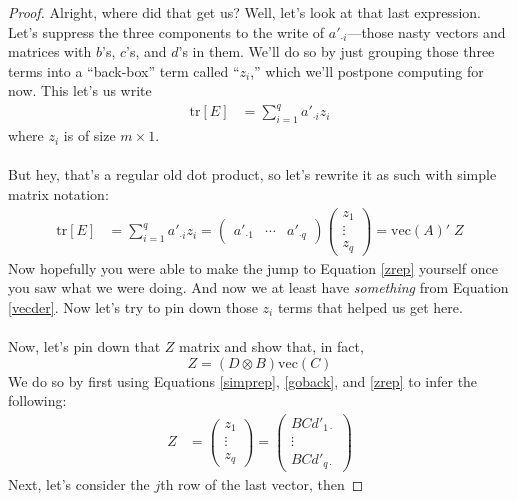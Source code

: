 \documentclass[12pt]{article}
\theoremstyle{plain}
\theoremstyle{definition}
\theoremstyle{remark}
\begin{document}
\begin{proof}
Alright, where did that get us? Well, let's look at
that last expression. Let's suppress the three
components to the write of $a'_{\cdot i}$---those nasty
vectors and matrices with $b$'s, $c$'s, and $d$'s in
them. We'll do so by just grouping those three
terms into a ``back-box'' term called ``$z_i$,'' which
we'll postpone computing for now.  This let's us
write
\begin{align}
    \text{tr}[E]
    &= \sum^q_{i=1} a'_{\cdot i}  z_i \label{goback}
\end{align}
where $z_i$ is of size $m\times 1$.
\\
\\
But hey, that's a regular old dot product, so let's
rewrite it as such with simple matrix notation:
\begin{align}
    \text{tr}[E]
	&= \sum^q_{i=1} a'_{\cdot i}  z_i
	= \begin{pmatrix} a'_{\cdot 1}
	    & \cdots & a'_{\cdot q} \end{pmatrix}
	    \begin{pmatrix} z_{1}
	    \\ \vdots \\ z_{q} \end{pmatrix}
	= \text{vec}(A)' \; Z
    \label{zrep}
\end{align}
Now hopefully you were able to make the jump to
Equation \ref{zrep} yourself once you saw what
we were doing.
And now we at least have \emph{something}
from Equation \ref{vecder}.
Now let's try to pin down those $z_i$ terms that
helped us get here.
\\
\\
Now, let's pin down that $Z$ matrix and show
that, in fact,
\begin{equation}
    Z = (D\otimes B) \text{vec}(C)
\end{equation}
We do so by first using Equations
\ref{simprep}, \ref{goback}, and \ref{zrep} to infer the
following:
\begin{align}
    Z &= \begin{pmatrix} z_1 \\ \vdots \\ z_q
	\end{pmatrix} =
	\begin{pmatrix} BCd'_{1\cdot} \\ \vdots \\ BCd'_{q\cdot}
	\end{pmatrix} \label{bigz}
\end{align}
Next, let's consider the $j$th row of the last vector, then

\end{proof}
\end{document}
